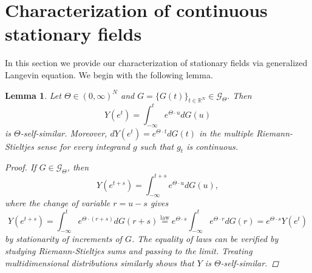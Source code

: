 \documentclass[english, a4paper, 12pt,reqno]{amsart}
\newtheorem{lemma}[defi]{Lemma}
\begin{document}
\section{Characterization of continuous stationary fields}
\label{sec:characterisation}
In this section we provide our characterization of stationary fields via generalized Langevin equation. We begin with the following lemma.
\begin{lemma}
\label{lemma:Y}
Let $\Theta\in (0,\infty)^N$ and $G = \{G(t)\}_{t\in\mathbb{R}^N}\in \mathcal{G}_\Theta.$ Then 
\begin{equation*}
Y(e^t) = \int_{-\infty}^t e^{\Theta\cdot u} dG(u)
\end{equation*} 
is $\Theta$-self-similar. Moreover, $dY(e^t) = e^{\Theta\cdot t}dG(t)$ in the multiple Riemann-Stieltjes sense for every integrand $g$ such that $g_t$ is continuous.
\begin{proof}
If $G\in\mathcal{G}_\Theta$, then
$$ Y(e^{t+s}) = \int_{-\infty}^{t+s} e^{\Theta\cdot u} dG(u), $$
where the change of variable $r=u-s$ gives
$$Y(e^{t+s}) = \int_{-\infty}^{t} e^{\Theta\cdot (r+s) } dG(r+s) \overset{\text{law}}{=} e^{\Theta\cdot s}\int_{-\infty}^{t} e^{\Theta\cdot r } dG(r) =e^{\Theta\cdot s} Y(e^t) $$
by stationarity of increments of $G$. The equality of laws can be verified by studying Riemann-Stieltjes sums and passing to the limit. Treating multidimensional distributions similarly shows that $Y$ is $\Theta$-self-similar. 


\end{proof}
\end{lemma}
\end{document}
